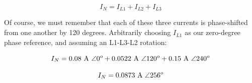 $$I_N = I_{L1} + I_{L2} + I_{L3}$$

Of course, we must remember that each of these three currents is phase-shifted from one another by 120 degrees.  Arbitrarily choosing $I_{L1}$ as our zero-degree phase reference, and assuming an L1-L3-L2 rotation:

$$I_N = 0.08 \hbox{ A } \angle 0^o + 0.0522 \hbox{ A } \angle 120^o + 0.15 \hbox{ A } \angle 240^o$$

$$I_N = 0.0873 \hbox{ A } \angle 256^o$$











